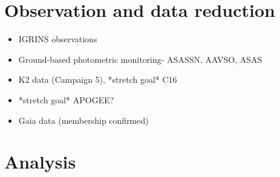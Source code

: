 \documentclass[twocolumn]{emulateapj}%
\begin{document}
\section{Observation and data reduction}
\begin{itemize}
\item IGRINS observations
\item Ground-based photometric monitoring- ASASSN, AAVSO, ASAS
\item K2 data (Campaign 5), *stretch goal* C16
\item *stretch goal* APOGEE?
\item Gaia data (membership confirmed)
\end{itemize}

\section{Analysis}
\end{document}
